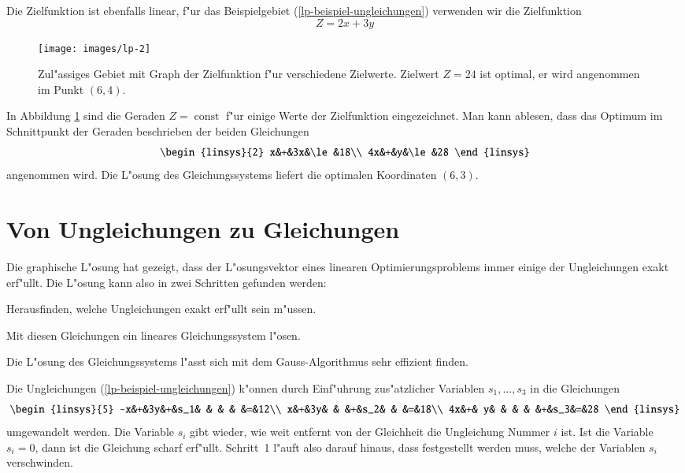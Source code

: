 Die Zielfunktion ist ebenfalls linear, f"ur das Beispielgebiet
(\ref{lp-beispiel-ungleichungen}) verwenden wir die Zielfunktion
\begin{equation}
Z=2x+3y
\label{lp-beispiel-zielfunktion}
\end{equation}
\begin{figure}
\begin{center}
\texttt{[image: images/lp-2]}
\end{center}
\caption{Zul"assiges Gebiet mit Graph der Zielfunktion f"ur verschiedene
Zielwerte. Zielwert $Z=24$ ist optimal, er wird angenommen im
Punkt $(6,4)$.
\label{lp-beispiel-zielfunktion}}
\end{figure}%
In Abbildung \ref{lp-beispiel-zielfunktion} sind die Geraden $Z=\operatorname{const}$
f"ur einige Werte der Zielfunktion eingezeichnet.
Man kann ablesen, dass das Optimum im Schnittpunkt der Geraden
beschrieben der beiden Gleichungen
\begin{equation}
\begin{linsys}{2}
x&+&3x&\le&18\\
4x&+&y&\le&28
\end{linsys}
\notag
\end{equation}
angenommen wird.
Die L"osung des Gleichungssystems liefert die optimalen Koordinaten
$(6,3)$.

\section{Von Ungleichungen zu Gleichungen}
Die graphische L"osung hat gezeigt, dass der L"osungsvektor eines
linearen Optimierungsproblems immer einige der Ungleichungen exakt
erf"ullt. Die L"osung kann also in zwei Schritten gefunden werden:
\begin{compactenum}
\item Herausfinden, welche Ungleichungen exakt erf"ullt sein m"ussen.
\item Mit diesen Gleichungen ein lineares Gleichungssystem l"osen.
\end{compactenum}
Die L"osung des Gleichungssystems l"asst sich mit dem Gauss-Algorithmus
sehr effizient finden.

Die Ungleichungen (\ref{lp-beispiel-ungleichungen}) k"onnen durch
Einf"uhrung zus"atzlicher Variablen $s_1,\dots,s_3$ in die Gleichungen
\begin{equation}
\begin{linsys}{5}
-x&+&3y&+&s_1& &   & &   &=&12\\
 x&+&3y& &   &+&s_2& &   &=&18\\
4x&+& y& &   & &   &+&s_3&=&28
\end{linsys}
\label{lp-ungleichungen-schlupf}
\end{equation}
umgewandelt werden.
Die Variable $s_i$ gibt wieder, wie weit entfernt von der Gleichheit
die Ungleichung Nummer $i$ ist.
Ist die Variable $s_i=0$, dann ist die Gleichung scharf erf"ullt.
Schritt~1 l"auft also darauf hinaus, dass festgestellt werden muss,
welche der Variablen $s_i$ verschwinden.

